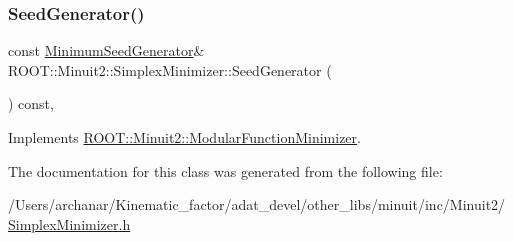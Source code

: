 \mbox{\label{classROOT_1_1Minuit2_1_1SimplexMinimizer_a7385d3ee5e4a48a796b11b51f7f0c408}} 
\subsubsection{\texorpdfstring{SeedGenerator()}{SeedGenerator()}\hspace{0.1cm}{\footnotesize\ttfamily [2/2]}}
{\footnotesize\ttfamily const \mbox{\hyperlink{classROOT_1_1Minuit2_1_1MinimumSeedGenerator}{Minimum\+Seed\+Generator}}\& R\+O\+O\+T\+::\+Minuit2\+::\+Simplex\+Minimizer\+::\+Seed\+Generator (\begin{DoxyParamCaption}{ }\end{DoxyParamCaption}) const\hspace{0.3cm}{\ttfamily [inline]}, {\ttfamily [virtual]}}



Implements \mbox{\hyperlink{classROOT_1_1Minuit2_1_1ModularFunctionMinimizer_a742930de97b0ce9ba23773874ae0894b}{R\+O\+O\+T\+::\+Minuit2\+::\+Modular\+Function\+Minimizer}}.



The documentation for this class was generated from the following file\+:\begin{DoxyCompactItemize}
\item 
/\+Users/archanar/\+Kinematic\+\_\+factor/adat\+\_\+devel/other\+\_\+libs/minuit/inc/\+Minuit2/\mbox{\hyperlink{other__libs_2minuit_2inc_2Minuit2_2SimplexMinimizer_8h}{Simplex\+Minimizer.\+h}}\end{DoxyCompactItemize}
